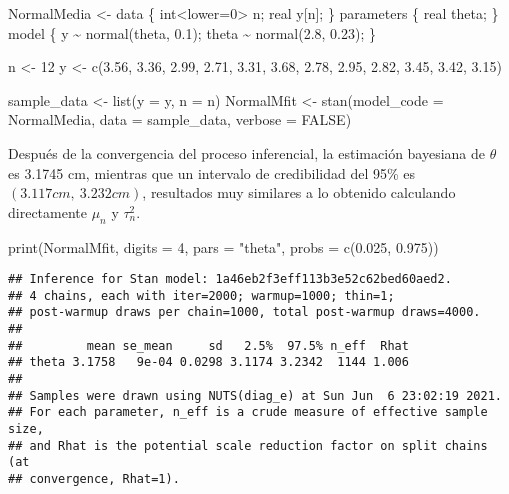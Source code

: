\documentclass[
  10pt,
  spanish,
]{book}
\newenvironment{Shaded}{\begin{snugshade}}{\end{snugshade}}
\newcommand{\AttributeTok}[1]{\textcolor[rgb]{0.77,0.63,0.00}{#1}}
\newcommand{\ConstantTok}[1]{\textcolor[rgb]{0.00,0.00,0.00}{#1}}
\newcommand{\DecValTok}[1]{\textcolor[rgb]{0.00,0.00,0.81}{#1}}
\newcommand{\FloatTok}[1]{\textcolor[rgb]{0.00,0.00,0.81}{#1}}
\newcommand{\FunctionTok}[1]{\textcolor[rgb]{0.00,0.00,0.00}{#1}}
\newcommand{\NormalTok}[1]{#1}
\newcommand{\OtherTok}[1]{\textcolor[rgb]{0.56,0.35,0.01}{#1}}
\newcommand{\StringTok}[1]{\textcolor[rgb]{0.31,0.60,0.02}{#1}}
\theoremstyle{definition}
\theoremstyle{definition}
\theoremstyle{definition}
\theoremstyle{definition}
\theoremstyle{remark}
\begin{document}
\begin{Shaded}
\begin{Highlighting}[]
\NormalTok{NormalMedia }\OtherTok{\textless{}{-}} \StringTok{\textquotesingle{}}
\StringTok{data \{}
\StringTok{  int\textless{}lower=0\textgreater{} n;}
\StringTok{  real y[n];}
\StringTok{\}}
\StringTok{parameters \{}
\StringTok{  real theta;}
\StringTok{\}}
\StringTok{model \{}
\StringTok{  y \textasciitilde{} normal(theta, 0.1);}
\StringTok{  theta \textasciitilde{} normal(2.8, 0.23);}
\StringTok{\}}
\StringTok{\textquotesingle{}}

\NormalTok{n }\OtherTok{\textless{}{-}} \DecValTok{12}
\NormalTok{y }\OtherTok{\textless{}{-}} \FunctionTok{c}\NormalTok{(}\FloatTok{3.56}\NormalTok{, }\FloatTok{3.36}\NormalTok{, }\FloatTok{2.99}\NormalTok{, }\FloatTok{2.71}\NormalTok{, }\FloatTok{3.31}\NormalTok{, }\FloatTok{3.68}\NormalTok{, }
       \FloatTok{2.78}\NormalTok{, }\FloatTok{2.95}\NormalTok{, }\FloatTok{2.82}\NormalTok{, }\FloatTok{3.45}\NormalTok{, }\FloatTok{3.42}\NormalTok{, }\FloatTok{3.15}\NormalTok{)}

\NormalTok{sample\_data }\OtherTok{\textless{}{-}} \FunctionTok{list}\NormalTok{(}\AttributeTok{y =}\NormalTok{ y, }\AttributeTok{n =}\NormalTok{ n)}
\NormalTok{NormalMfit }\OtherTok{\textless{}{-}} \FunctionTok{stan}\NormalTok{(}\AttributeTok{model\_code =}\NormalTok{ NormalMedia,}
                   \AttributeTok{data =}\NormalTok{ sample\_data, }\AttributeTok{verbose =} \ConstantTok{FALSE}\NormalTok{)}
\end{Highlighting}
\end{Shaded}

Después de la convergencia del proceso inferencial, la estimación bayesiana de \(\theta\) es 3.1745 cm, mientras que un intervalo de credibilidad del 95\% es \((3.117 cm,\ 3.232 cm)\), resultados muy similares a lo obtenido calculando directamente \(\mu_n\) y \(\tau^2_n\).

\begin{Shaded}
\begin{Highlighting}[]
\FunctionTok{print}\NormalTok{(NormalMfit, }\AttributeTok{digits =} \DecValTok{4}\NormalTok{, }
      \AttributeTok{pars =} \StringTok{"theta"}\NormalTok{, }\AttributeTok{probs =} \FunctionTok{c}\NormalTok{(}\FloatTok{0.025}\NormalTok{, }\FloatTok{0.975}\NormalTok{))}
\end{Highlighting}
\end{Shaded}

\begin{verbatim}
## Inference for Stan model: 1a46eb2f3eff113b3e52c62bed60aed2.
## 4 chains, each with iter=2000; warmup=1000; thin=1; 
## post-warmup draws per chain=1000, total post-warmup draws=4000.
## 
##         mean se_mean     sd   2.5%  97.5% n_eff  Rhat
## theta 3.1758   9e-04 0.0298 3.1174 3.2342  1144 1.006
## 
## Samples were drawn using NUTS(diag_e) at Sun Jun  6 23:02:19 2021.
## For each parameter, n_eff is a crude measure of effective sample size,
## and Rhat is the potential scale reduction factor on split chains (at 
## convergence, Rhat=1).
\end{verbatim}
\end{document}
